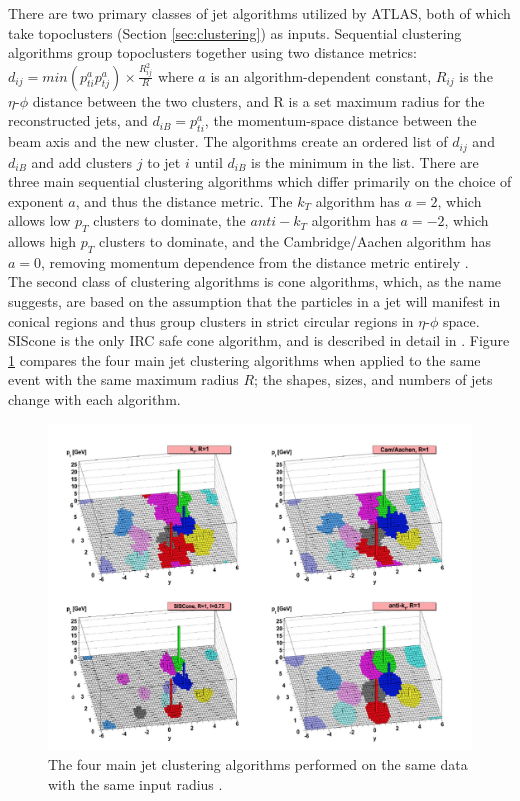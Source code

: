 There are two primary classes of jet algorithms utilized by ATLAS,  both of which take topoclusters (Section \ref{sec:clustering}) as inputs. Sequential clustering algorithms group topoclusters together using two distance metrics: $d_{ij}=min(p_{ti}^ap_{tj}^a)\times\frac{R_{ij}^2}{R}$ where $a$ is an algorithm-dependent constant, $R_{ij}$ is the $\eta\text{-}\phi$ distance between the two clusters, and R is a set maximum radius for the reconstructed jets, and $d_{iB}=p_{ti}^a$, the momentum-space distance between the beam axis and the new cluster. The algorithms create an ordered list of $d_{ij}$ and $d_{iB}$ and add clusters $j$ to jet $i$ until $d_{iB}$ is the minimum in the list. There are three main sequential clustering algorithms which differ primarily on the choice of exponent $a$, and thus the distance metric. The $k_T$ algorithm has $a=2$, which allows low $p_T$ clusters to dominate, the $anti-k_T$ algorithm has $a=-2$, which allows high $p_T$ clusters to dominate, and the Cambridge/Aachen algorithm has $a=0$, removing momentum dependence from the distance metric entirely \cite{jet_algs}.\\

The second class of clustering algorithms is cone algorithms, which, as the name suggests, are based on the assumption that the particles in a jet will manifest in conical regions and thus group clusters in strict circular regions in $\eta\text{-}\phi$ space. SIScone is the only IRC safe cone algorithm, and is described in detail in \cite{jet_algs}. Figure \ref{fig:jet_algs} compares the four main jet clustering algorithms when applied to the same event with the same maximum radius $R$; the shapes, sizes, and numbers of jets change with each algorithm.\\

\begin{figure}[h]
    \centering
    \includegraphics[width=5in]{figures/chapter3/jet_algs.png}
    \caption{The four main jet clustering algorithms performed on the same data with the same input radius \cite{jet_algs}.}
    \label{fig:jet_algs}
\end{figure}

